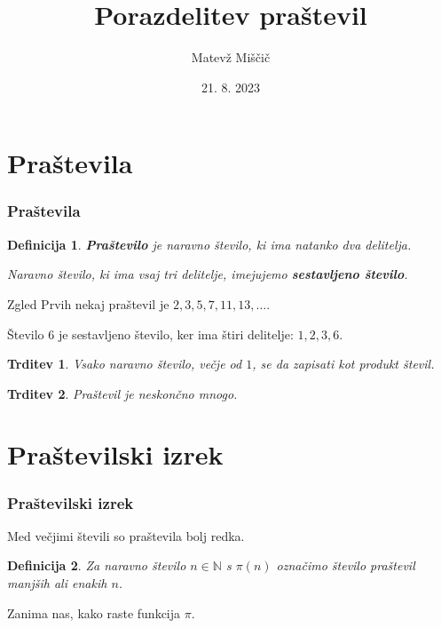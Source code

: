 \documentclass{beamer}
\newtheorem{definicija}{Definicija}
\newtheorem{trditev}{Trditev}
\def\N{\mathbb{N}}
\begin{document}

\title{Porazdelitev praštevil}
\author{Matevž Miščič}
\date{21. 8. 2023}
\begin{frame}
   \titlepage
\end{frame}


\section{Praštevila}
\begin{frame}
    \frametitle{Praštevila}
    \begin{definicija}
        \textbf{Praštevilo} je naravno število, ki ima natanko dva delitelja.

        Naravno število, ki ima vsaj tri delitelje, imejujemo \textbf{sestavljeno število}.
    \end{definicija}
    \pause
    \medskip
    \begin{exampleblock}{Zgled}
        Prvih nekaj praštevil je $2, 3, 5, 7, 11, 13, \ldots$.

        Število $6$ je sestavljeno število, ker ima štiri delitelje: $1, 2, 3, 6$.
    \end{exampleblock}
 \end{frame}


\begin{frame}
    \begin{trditev}
        Vsako naravno število, večje od $1$, se da zapisati kot produkt števil.
    \end{trditev}
    \bigskip
    \pause
    \begin{trditev}
        Praštevil je neskončno mnogo.
    \end{trditev}
\end{frame}


\section{Praštevilski izrek}
\begin{frame}
    \frametitle{Praštevilski izrek}
    Med večjimi števili so praštevila bolj redka.
    \medskip
    \begin{definicija}
        Za naravno število $n \in \N$ s \textbf{$\pi(n)$} označimo število praštevil manjših ali enakih $n$.
    \end{definicija}
    \medskip
    Zanima nas, kako raste funkcija $\pi$.
\end{frame}
\end{document}
